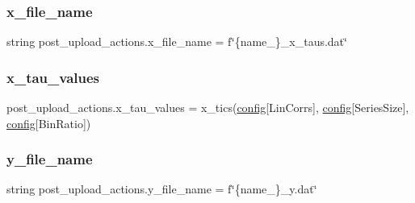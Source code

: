 \subsubsection{\texorpdfstring{x\+\_\+file\+\_\+name}{x\_file\_name}}
{\footnotesize\ttfamily string post\+\_\+upload\+\_\+actions.\+x\+\_\+file\+\_\+name = f\char`\"{}\{name\+\_\+\}\+\_\+x\+\_\+taus.\+dat\char`\"{}}

\mbox{\label{namespacepost__upload__actions_adee53b372de24d69e9156b1df89e0611}} 
\subsubsection{\texorpdfstring{x\+\_\+tau\+\_\+values}{x\_tau\_values}}
{\footnotesize\ttfamily post\+\_\+upload\+\_\+actions.\+x\+\_\+tau\+\_\+values = x\+\_\+tics(\hyperlink{namespacepost__upload__actions_accb09cfbbad171dde59d37a322e7d426}{config}\mbox{[}\textquotesingle{}Lin\+Corrs\textquotesingle{}\mbox{]}, \hyperlink{namespacepost__upload__actions_accb09cfbbad171dde59d37a322e7d426}{config}\mbox{[}\textquotesingle{}Series\+Size\textquotesingle{}\mbox{]}, \hyperlink{namespacepost__upload__actions_accb09cfbbad171dde59d37a322e7d426}{config}\mbox{[}\textquotesingle{}Bin\+Ratio\textquotesingle{}\mbox{]})}

\mbox{\label{namespacepost__upload__actions_a9989a70c849a81f874a7499fe566446c}} 
\subsubsection{\texorpdfstring{y\+\_\+file\+\_\+name}{y\_file\_name}}
{\footnotesize\ttfamily string post\+\_\+upload\+\_\+actions.\+y\+\_\+file\+\_\+name = f\char`\"{}\{name\+\_\+\}\+\_\+y.\+dat\char`\"{}}

